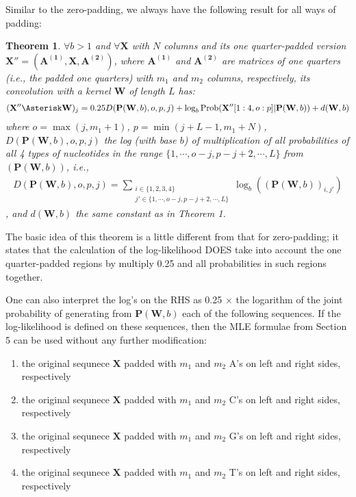 \documentclass[12pt]{article}
\newcommand{\matrixSymbol}[1]{\mathbf{#1}}
\newtheorem{theorem}{Theorem}
\begin{document}
Similar to the zero-padding, we always have the following result for all ways of padding:

\begin{theorem}
$\forall b > 1$ and $\forall \matrixSymbol{X}$ with $N$ columns and its one quarter-padded version $\matrixSymbol{X''} = \left( \matrixSymbol{A^{(1)}}, \matrixSymbol{X}, \matrixSymbol{A^{(2)}}\right)$, where $\matrixSymbol{A^{(1)}}$ and $\matrixSymbol{A^{(2)}}$ are matrices of one quarters (i.e., the padded one quarters) with $m_1$ and $m_2$ columns, respectively, its convolution with a kernel $\matrixSymbol{W}$ of length $L$ has:
\begin{align}
 (\matrixSymbol{X''} \Asterisk \matrixSymbol{W})_j = 0.25D(\matrixSymbol{P}(\matrixSymbol{W}, b), o, p, j) + \log_b{\mathrm{Prob}(\matrixSymbol{X''}[1:4, o:p]|\matrixSymbol{P}(\matrixSymbol{W}, b))} + d(\matrixSymbol{W}, b)
\end{align}
where $o = \max(j, m_1 + 1)$, $p = \min(j+L-1, m_1 + N)$,  $D(\matrixSymbol{P}(\matrixSymbol{W}, b), o, p, j)$ the log (with base $b$) of multiplication of all probabilities of all 4 types of nucleotides in the range $\{1, \cdots, o-j, p-j+2, \cdots, L\}$ from $(\matrixSymbol{P}(\matrixSymbol{W}, b))$, i.e.,
\begin{align}
D(\matrixSymbol{P}(\matrixSymbol{W}, b), o, p, j) = \sum_{\substack{i \in \{1,2,3,4\} \\ j' \in \{1, \cdots, o-j, p-j+2, \cdots, L\}} }{  \log_{b}\left( (\matrixSymbol{P}(\matrixSymbol{W}, b))_{i, j'} \right) }
\end{align}
, and $d(\matrixSymbol{W}, b)$ the same constant as in Theorem 1.
\end{theorem}

The basic idea of this theorem is a little different from that for zero-padding; it states that the calculation of the log-likelihood DOES take into account the one quarter-padded regions by multiply 0.25 and all probabilities in such regions together. 

One can also interpret the log's on the RHS as 0.25 $\times$ the logarithm of the joint probability of generating from $\matrixSymbol{P}(\matrixSymbol{W}, b)$ each of the following sequences. If the log-likelihood is defined on these sequences, then the MLE formulae from Section 5 can be used without any further modification:

\begin{enumerate}
\item the original sequnece $\matrixSymbol{X}$ padded with $m_1$ and $m_2$ A's on left and right sides, respectively
\item the original sequnece $\matrixSymbol{X}$ padded with $m_1$ and $m_2$ C's on left and right sides, respectively
\item the original sequnece $\matrixSymbol{X}$ padded with $m_1$ and $m_2$ G's on left and right sides, respectively
\item the original sequnece $\matrixSymbol{X}$ padded with $m_1$ and $m_2$ T's on left and right sides, respectively

\end{enumerate}
\end{document}
